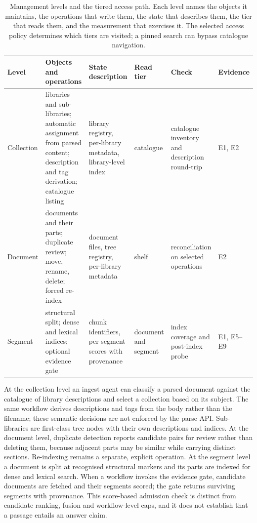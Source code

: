 \begin{table}[t]
\centering
\small
\setlength{\tabcolsep}{4pt}
\renewcommand{\arraystretch}{1.15}
\caption{Management levels and the tiered access path. Each level names the
objects it maintains, the operations that write them, the state that describes
them, the tier that reads them, and the measurement that exercises it.
The selected access policy determines which tiers are visited; a pinned
search can bypass catalogue navigation.}
\label{tab:levels}
\begin{tabular}{@{}>{\raggedright\arraybackslash}p{}>{\raggedright\arraybackslash}p{}>{\raggedright\arraybackslash}p{}>{\raggedright\arraybackslash}p{}>{\raggedright\arraybackslash}p{}>{\raggedright\arraybackslash}p{}@{}}
\toprule
Level & Objects and operations & State description & Read tier & Check & Evidence\\
\midrule
Collection & libraries and sub-libraries; automatic assignment from parsed content; description and tag derivation; catalogue listing & library registry, per-library metadata, library-level index & catalogue & catalogue inventory and description round-trip & E1, E2\\
Document & documents and their parts; duplicate review; move, rename, delete; forced re-index & document files, tree registry, per-library metadata & shelf & reconciliation on selected operations & E2\\
Segment & structural split; dense and lexical indices; optional evidence gate & chunk identifiers, per-segment scores with provenance & document and segment & index coverage and post-index probe & E1, E5--E9\\
\bottomrule
\end{tabular}
\end{table}

At the collection level an ingest agent can classify a parsed document against
the catalogue of library descriptions and select a collection based on its
subject. The same workflow derives descriptions and tags from the body rather
than the filename; these semantic decisions are not enforced by the parse API.
Sub-libraries are first-class tree nodes with their own descriptions and
indices. At the document level, duplicate detection reports candidate pairs for
review rather than deleting them, because adjacent parts may be similar while
carrying distinct sections. Re-indexing remains a separate, explicit operation.
At the segment level a document is split at recognised structural markers and
its parts are indexed for dense and lexical search. When a workflow invokes the
evidence gate, candidate documents are fetched and their segments scored; the
gate returns surviving segments with provenance. This score-based admission
check is distinct from candidate ranking, fusion and workflow-level caps, and
it does not establish that a passage entails an answer claim.

